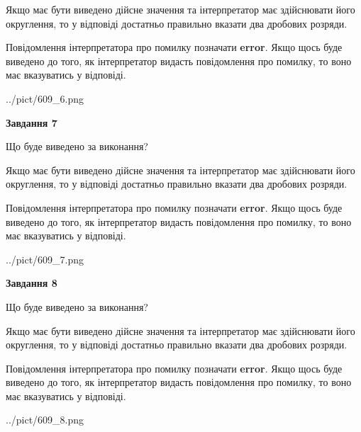 \documentclass[12pt, ukrainian]{article}
\begin{document}
{\begin {Large}
Якщо має бути виведено дійсне значення та інтерпретатор має здійснювати його округлення, 
то у відповіді достатньо правильно вказати два дробових розряди.

Повідомлення інтерпретатора про помилку позначати \textbf{error}.
Якщо щось буде виведено до того, як інтерпретатор видасть повідомлення про помилку, 
то воно має вказуватись у відповіді. \par

\begin{center}
	{../pict/609_6.png}
\end{center}
\newpage

{\begin {center}\textbf{Завдання 7}\end {center}}\par
Що буде виведено за виконання? \par

Якщо має бути виведено дійсне значення та інтерпретатор має здійснювати його округлення, 
то у відповіді достатньо правильно вказати два дробових розряди.

Повідомлення інтерпретатора про помилку позначати \textbf{error}.
Якщо щось буде виведено до того, як інтерпретатор видасть повідомлення про помилку, 
то воно має вказуватись у відповіді. \par

\begin{center}
	{../pict/609_7.png}
\end{center}
\newpage

{\begin {center}\textbf{Завдання 8}\end {center}}\par
Що буде виведено за виконання? \par

Якщо має бути виведено дійсне значення та інтерпретатор має здійснювати його округлення, 
то у відповіді достатньо правильно вказати два дробових розряди.

Повідомлення інтерпретатора про помилку позначати \textbf{error}.
Якщо щось буде виведено до того, як інтерпретатор видасть повідомлення про помилку, 
то воно має вказуватись у відповіді. \par

\begin{center}
	{../pict/609_8.png}
\end{center}
\newpage


\end{Large}}
\end{document}

